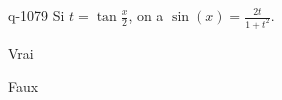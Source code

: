 \begin{truefalse}{q-1079}
Si $t=\tan\frac{x}{2}$, on a $\sin(x)=\frac{2t}{1+t^2}$.
\item* Vrai
\item Faux
\end{truefalse}

